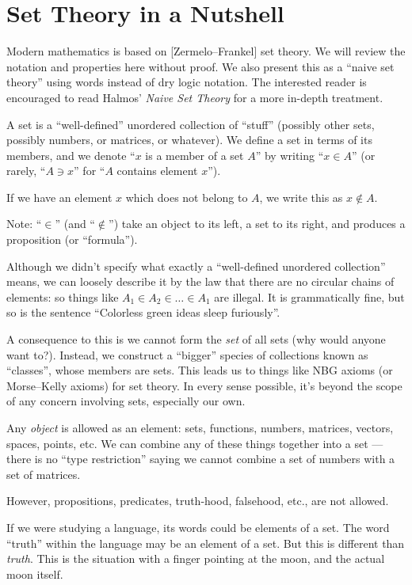 \section{Set Theory in a Nutshell}\label{section:appendix-sets}

\M
Modern mathematics is based on [Zermelo--Frankel] set theory. We will
review the notation and properties here without proof. We also present
this as a ``naive set theory'' using words instead of dry logic notation.
The interested reader is encouraged to read Halmos' \textit{Naive Set Theory}
for a more in-depth treatment.

A set is a ``well-defined'' unordered
collection of ``stuff'' (possibly other sets, possibly numbers, or
matrices, or whatever). We define a set in terms of its members, and we
denote ``$x$ is a member of a set $A$'' by writing ``$x\in A$'' (or
rarely, ``$A\ni x$'' for ``$A$ contains element $x$'').

If we have an element $x$ which does not belong to $A$, we write this as
$x\notin A$.

Note: ``$\in$'' (and ``$\notin$'') take an object to its left, a set to
its right, and produces a proposition (or ``formula'').

Although we didn't specify what exactly a ``well-defined unordered collection''
means, we can loosely describe it by the law that there are no circular
chains of elements: so things like
$A_{1}\in A_{2}\in\dots\in A_{1}$ are illegal. It is grammatically fine,
but so is the sentence ``Colorless green ideas sleep furiously''.

A consequence to this is we cannot form the \emph{set} of all sets (why
would anyone want to?). Instead, we construct a ``bigger'' species of
collections known as ``classes'', whose members are sets. This leads us
to things like NBG axioms (or Morse--Kelly axioms) for set theory. In
every sense possible, it's beyond the scope of any concern involving sets,
especially our own.

Any \emph{object} is allowed as an element: sets, functions, numbers,
matrices, vectors, spaces, points, etc. We can combine any of these
things together into a set --- there is no ``type restriction'' saying
we cannot combine a set of numbers with a set of matrices.

However, propositions, predicates, truth-hood, falsehood, etc., are not allowed.

If we were studying a language, its words could be elements of a
set. The word ``truth'' within the language may be an element of a
set. But this is different than \emph{truth}. This is the situation with
a finger pointing at the moon, and the actual moon itself.

